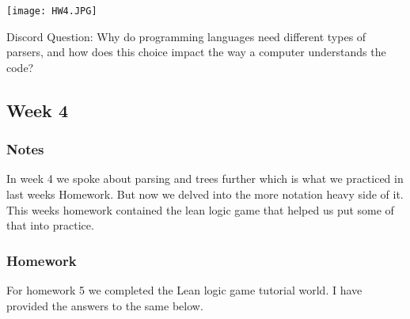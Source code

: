 \documentclass{article}
\theoremstyle{theorem}
\theoremstyle{definition}
\theoremstyle{remark}
\begin{document}
\texttt{[image: HW4.JPG]}

Discord Question: Why do programming languages need different types of parsers, and how does this choice impact the way a computer understands the code?

\subsection{Week 4}
\subsubsection*{Notes}
In week 4 we spoke about parsing and trees further which is what we practiced in last weeks Homework. But now we delved into the more notation heavy side of it. This weeks homework contained the lean logic game that helped us put some of that into practice.

\subsubsection*{Homework}
For homework 5 we completed the Lean logic game tutorial world. I have provided the answers to the same below. 
\end{document}
